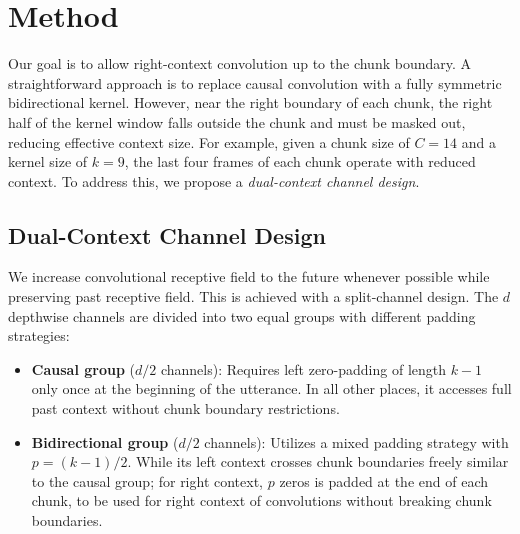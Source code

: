\documentclass[cameraready]{Interspeech}
\begin{document}
\section{Method}
\label{sec:method}





Our goal is to allow right-context convolution up to the chunk boundary. A
straightforward approach is to replace causal convolution with a fully
symmetric bidirectional kernel. 
However, near the right boundary of each chunk, the right half of the kernel window falls outside the chunk and must be masked out, reducing effective context size. For example, given a chunk size of $C{=}14$ and a kernel size of 
$k{=}9$, the last four frames of each chunk operate with reduced context. 
To address this, we propose a \emph{dual-context channel design}.

\subsection{Dual-Context Channel Design}
\label{sec:chunk_conv}

We increase convolutional receptive field to the future whenever possible while
preserving past receptive field. This is achieved with a split-channel
design. The $d$ depthwise channels
are divided into two equal groups with different padding strategies:
\begin{itemize}
    \item \textbf{Causal group} ($d/2$ channels): Requires left zero-padding of length $k-1$ only once at the beginning of the utterance. In all other places, it accesses full past context without chunk boundary restrictions.
    \item \textbf{Bidirectional group} ($d/2$ channels): Utilizes a mixed padding strategy with $p=(k-1)/2$. While its left context crosses chunk boundaries freely similar to the causal group; for right context, $p$ zeros is padded at the end of each chunk, to be used for right context of convolutions without breaking chunk boundaries.
\end{itemize}
\end{document}
